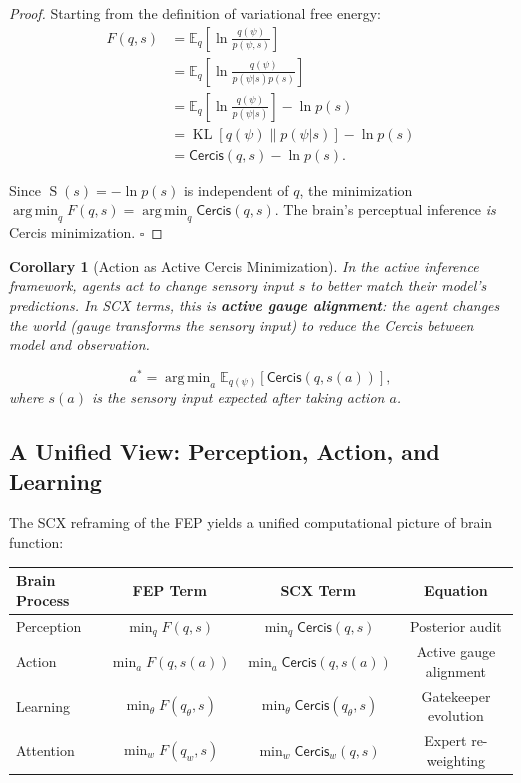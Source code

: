\documentclass[12pt,a4paper]{article}
\newtheorem{corollary}[theorem]{Corollary}
\theoremstyle{remark}
\newcommand{\E}{\mathbb{E}}
\newcommand{\SCX}{\textsf{SCX}}
\newcommand{\Cercis}{\textsf{Cercis}}
\newcommand{\FEP}{\textsf{FEP}}
\newcommand{\FreeEnergy}{F}
\DeclareMathOperator{\argmin}{arg\,min}
\DeclareMathOperator{\KL}{KL}
\DeclareMathOperator{\Surprise}{S}
\begin{document}
\begin{proof}
Starting from the definition of variational free energy:
\begin{align}
    \FreeEnergy(q, s) &= \E_q\left[\ln \frac{q(\psi)}{p(\psi, s)}\right] \\
    &= \E_q\left[\ln \frac{q(\psi)}{p(\psi | s) p(s)}\right] \\
    &= \E_q\left[\ln \frac{q(\psi)}{p(\psi | s)}\right] - \ln p(s) \\
    &= \KL[q(\psi) \| p(\psi | s)] - \ln p(s) \\
    &= \Cercis(q, s) - \ln p(s).
\end{align}

Since $\Surprise(s) = -\ln p(s)$ is independent of $q$, the minimization
$\argmin_q \FreeEnergy(q, s) = \argmin_q \Cercis(q, s)$. The brain's
perceptual inference \emph{is} Cercis minimization. $\square$
\end{proof}

\begin{corollary}[Action as Active Cercis Minimization]\label{cor:action-cercis}
In the active inference framework, agents act to change sensory input $s$ to
better match their model's predictions. In SCX terms, this is \textbf{active
gauge alignment}: the agent changes the world (gauge transforms the sensory
input) to reduce the \Cercis{} between model and observation.

\begin{equation}\label{eq:active-cercis}
    a^* = \argmin_a \E_{q(\psi)}[\Cercis(q, s(a))],
\end{equation}
where $s(a)$ is the sensory input expected after taking action $a$.
\end{corollary}

\subsection{A Unified View: Perception, Action, and Learning}

The \SCX{} reframing of the \FEP{} yields a unified computational picture of
brain function:

\begin{center}
\begin{tabular}{lccc}
\toprule
\textbf{Brain Process} & \textbf{FEP Term} & \textbf{SCX Term} & \textbf{Equation} \\
\midrule
Perception & $\min_q \FreeEnergy(q, s)$ & $\min_q \Cercis(q, s)$ & Posterior audit \\
Action      & $\min_a \FreeEnergy(q, s(a))$ & $\min_a \Cercis(q, s(a))$ & Active gauge alignment \\
Learning    & $\min_\theta \FreeEnergy(q_\theta, s)$ & $\min_\theta \Cercis(q_\theta, s)$ & Gatekeeper evolution \\
Attention   & $\min_w \FreeEnergy(q_w, s)$ & $\min_w \Cercis_w(q, s)$ & Expert re-weighting \\
\bottomrule
\end{tabular}
\end{center}
\end{document}
